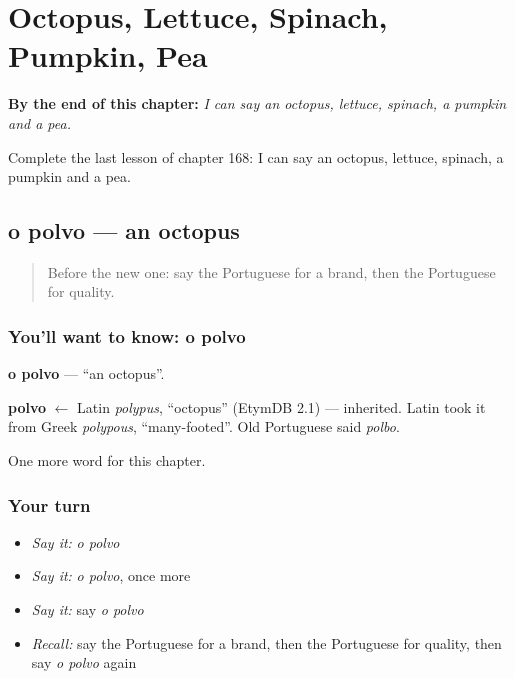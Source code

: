
\chapter{Octopus, Lettuce, Spinach, Pumpkin, Pea}
\label{ch:pt-octopus-lettuce-spinach-pumpkin-pea}

\begin{chapteropening}
\textbf{By the end of this chapter:} \emph{I can say an octopus, lettuce, spinach, a pumpkin and a pea.}

Complete the last lesson of chapter 168: I can say an octopus, lettuce, spinach, a pumpkin and a pea.
\end{chapteropening}

\section[o polvo]{o polvo — an octopus}

\label{lesson:PT-C168-polvo}



\begin{quote}
Before the new one: say the Portuguese for a brand, then the Portuguese for quality.
\end{quote}

\subsection*{You'll want to know: o polvo}
\textbf{o polvo} — \textquotedblleft{}an octopus\textquotedblright{}.

\begin{cousinweb}
\textbf{polvo} $\leftarrow$ Latin \emph{polypus}, \textquotedblleft{}octopus\textquotedblright{} (EtymDB 2.1) — inherited. Latin took it from Greek \emph{polypous}, \textquotedblleft{}many-footed\textquotedblright{}. Old Portuguese said \emph{polbo}.
\end{cousinweb}

\begin{grammarlens}[title={What you've built}]
One more word for this chapter.
\end{grammarlens}

\subsection*{Your turn}
\begin{itemize}
\raggedright
  \item \emph{Say it:} \emph{o polvo}
  \item \emph{Say it:} \emph{o polvo}, once more
  \item \emph{Say it:} say \emph{o polvo}
  \item \emph{Recall:} say the Portuguese for a brand, then the Portuguese for quality, then say \emph{o polvo} again
\end{itemize}

